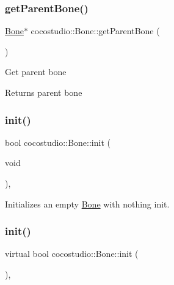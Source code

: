 \subsubsection{\texorpdfstring{get\+Parent\+Bone()}{getParentBone()}\hspace{0.1cm}{\footnotesize\ttfamily [2/2]}}
{\footnotesize\ttfamily \hyperlink{classcocostudio_1_1Bone}{Bone}$\ast$ cocostudio\+::\+Bone\+::get\+Parent\+Bone (\begin{DoxyParamCaption}{ }\end{DoxyParamCaption})}

Get parent bone \begin{DoxyReturn}{Returns}
parent bone 
\end{DoxyReturn}
\mbox{\label{classcocostudio_1_1Bone_a09affc6003ebdaf349d7c5cc4c62230e}} 
\subsubsection{\texorpdfstring{init()}{init()}\hspace{0.1cm}{\footnotesize\ttfamily [1/4]}}
{\footnotesize\ttfamily bool cocostudio\+::\+Bone\+::init (\begin{DoxyParamCaption}\item[{void}]{ }\end{DoxyParamCaption})\hspace{0.3cm}{\ttfamily [override]}, {\ttfamily [virtual]}}

Initializes an empty \hyperlink{classcocostudio_1_1Bone}{Bone} with nothing init. \mbox{\label{classcocostudio_1_1Bone_aa5f72eb1a7b5593b3c0f9ad4bf3a3b71}} 
\subsubsection{\texorpdfstring{init()}{init()}\hspace{0.1cm}{\footnotesize\ttfamily [2/4]}}
{\footnotesize\ttfamily virtual bool cocostudio\+::\+Bone\+::init (\begin{DoxyParamCaption}{ }\end{DoxyParamCaption})\hspace{0.3cm}{\ttfamily [override]}, {\ttfamily [virtual]}}

